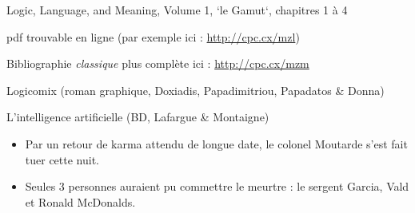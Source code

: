 \begin{frame} %
	

\begin{description}[labelindent=6pt,style=multiline,leftmargin=1.3in]
	 \setlength\itemsep{1em}
\item[Le classique] Logic, Language, and Meaning, Volume 1, `le Gamut`, chapitres 1 à 4
\item[] pdf trouvable en ligne (par exemple ici : \url{http://cpc.cx/mzl})\pause
\item[Bonus] Bibliographie \textit{classique} plus complète ici : \url{http://cpc.cx/mzm}\pause
\item[Histoire] Logicomix (roman graphique, Doxiadis, Papadimitriou, Papadatos \& Donna)\pause
\item[Culture scientifique] L'intelligence artificielle (BD, Lafargue \& Montaigne)

	\end{description}
\end{frame}



\begin{frame}

\begin{itemize}
\item Par un retour de karma attendu de longue date, le colonel Moutarde s'est fait tuer cette nuit. 

\item Seules 3 personnes auraient pu commettre le meurtre : le sergent Garcia, Vald et Ronald McDonalds.
\end{itemize}
\end{frame}




